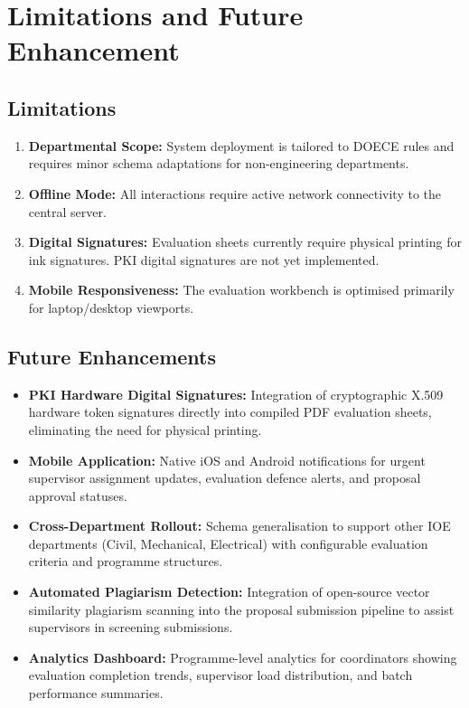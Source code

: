 \documentclass[12pt]{report}
\begin{document}
\chapter{Limitations and Future Enhancement}

\section{Limitations}
\begin{enumerate}[leftmargin=1.5cm]
    \item \textbf{Departmental Scope:} System deployment is tailored to DOECE rules
          and requires minor schema adaptations for non-engineering departments.
    \item \textbf{Offline Mode:} All interactions require active network connectivity
          to the central server.
    \item \textbf{Digital Signatures:} Evaluation sheets currently require physical
          printing for ink signatures. PKI digital signatures are not yet implemented.
    \item \textbf{Mobile Responsiveness:} The evaluation workbench is optimised
          primarily for laptop/desktop viewports.
\end{enumerate}

\section{Future Enhancements}
\begin{itemize}[leftmargin=1.5cm]
    \item \textbf{PKI Hardware Digital Signatures:} Integration of cryptographic
          X.509 hardware token signatures directly into compiled PDF evaluation sheets,
          eliminating the need for physical printing.
    \item \textbf{Mobile Application:} Native iOS and Android notifications for urgent
          supervisor assignment updates, evaluation defence alerts, and proposal
          approval statuses.
    \item \textbf{Cross-Department Rollout:} Schema generalisation to support other
          IOE departments (Civil, Mechanical, Electrical) with configurable evaluation
          criteria and programme structures.
    \item \textbf{Automated Plagiarism Detection:} Integration of open-source vector
          similarity plagiarism scanning into the proposal submission pipeline to assist
          supervisors in screening submissions.
    \item \textbf{Analytics Dashboard:} Programme-level analytics for coordinators
          showing evaluation completion trends, supervisor load distribution, and
          batch performance summaries.
\end{itemize}
\end{document}
